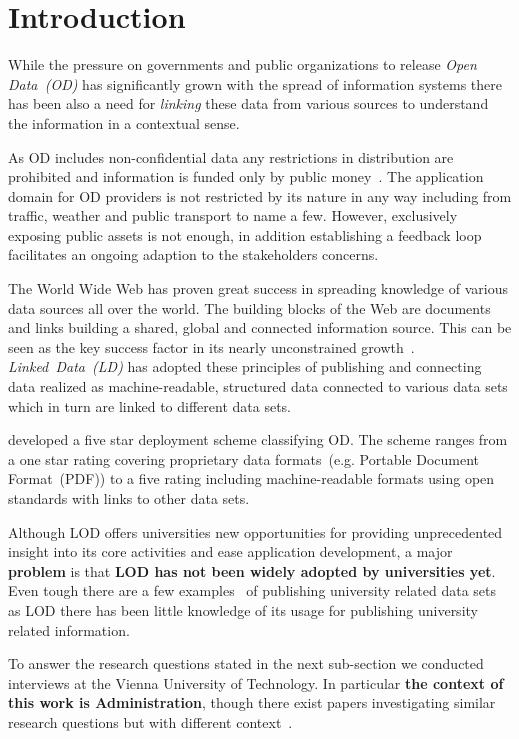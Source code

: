 \documentclass{article}
\begin{document}
\section{Introduction}
While the pressure on governments and public organizations to release \textit{Open Data~(OD)} has significantly grown with the spread of information systems there has been also a need for \textit{linking} these data from various sources to understand the information in a contextual sense.

As OD includes non-confidential data any restrictions in distribution are prohibited and information is funded only by public money~\cite{article:janssen2012benefits}. The application domain for OD providers is not restricted by its nature in any way including from traffic, weather and public transport to name a few. However, exclusively exposing public assets is not enough, in addition establishing a feedback loop facilitates an ongoing adaption to the stakeholders concerns. 

The World Wide Web has proven great success in spreading knowledge of various data sources all over the world. The building blocks of the Web are documents and links building a shared, global and connected information source. This can be seen as the key success factor in its nearly unconstrained growth~\cite{report:jacobs-i-2004--a}. 
\textit{Linked~Data~(LD)} has adopted these principles of publishing and connecting data realized as machine-readable, structured data connected to various data sets which in turn are linked to different data sets. 

\citet{artivle:bernerslee-t-2006-1} developed a five star deployment scheme classifying OD. The scheme ranges from a one star rating covering proprietary data formats~(e.g. Portable Document Format~(PDF)) to a five rating including machine-readable formats using open standards with links to other data sets.

Although LOD offers universities new opportunities for providing unprecedented insight into its core activities and ease application development, a major \textbf{problem} is that \textbf{LOD has not been widely adopted by universities yet}. Even tough there are a few examples~\cite{url:linked-universities-members} of publishing university related data sets as LOD there has been little knowledge of its usage for publishing university related information. 

To answer the research questions stated in the next sub-section we conducted interviews at the Vienna University of Technology. In particular \textbf{the context of this work is Administration}, though there exist papers investigating similar research questions but with different context~\cite{article:baronyai_publishing_2016, article:haller_publishing_2016}. 
\end{document}
